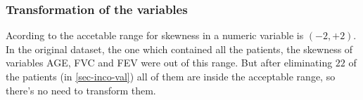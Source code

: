\subsubsection{Transformation of the variables} \label{sec-var-trans}
Acording to  the accetable range for skewness in a numeric
variable is $(-2, +2)$. In the original dataset, the one which contained all the patients, the skewness of variables AGE, FVC and FEV were out of this range. But after eliminating $22$ of the patients (in \ref{sec-inco-val}) all of them are inside the acceptable range, so there's no need to transform them.

%
%







